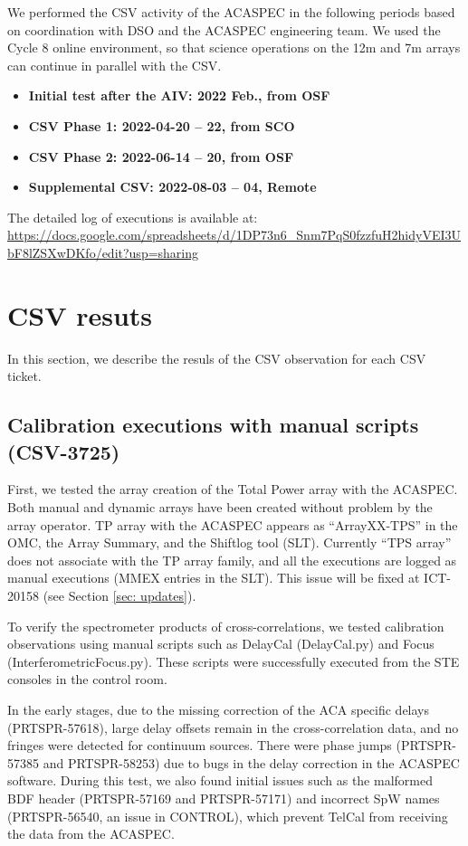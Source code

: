 We performed the CSV activity of the ACASPEC in the following periods based on coordination with DSO and the ACASPEC engineering team. We used the Cycle 8 online environment, so that science operations on the 12m and 7m arrays can continue in parallel with the CSV. 
\begin{itemize}
\item \textbf{Initial test after the AIV: 2022 Feb., from OSF}
\item \textbf{CSV Phase 1: 2022-04-20 -- 22, from SCO}
\item \textbf{CSV Phase 2: 2022-06-14 -- 20, from OSF}
\item \textbf{Supplemental CSV: 2022-08-03 -- 04, Remote}
\end{itemize}
The detailed log of executions is available at:\\
\url{https://docs.google.com/spreadsheets/d/1DP73n6_Snm7PqS0fzzfuH2hidyVEI3UbF8lZSXwDKfo/edit?usp=sharing}  

\newpage
\section{CSV resuts}\label{sec:result}
In this section, we describe the resuls of the CSV observation for each CSV ticket. 

\subsection{Calibration executions with manual scripts (CSV-3725)}
First, we tested the array creation of the Total Power array with the ACASPEC. Both manual and dynamic arrays have been created without problem by the array operator. TP array with the ACASPEC appears as ``ArrayXX-TPS'' in the OMC, the Array Summary, and the Shiftlog tool (SLT). Currently ``TPS array'' does not associate with the TP array family, and all the executions are logged as manual executions (MMEX entries in the SLT). This issue will be fixed at ICT-20158 (see Section \ref{sec: updates}).   

To verify the spectrometer products of cross-correlations, we tested calibration observations using manual scripts such as DelayCal (DelayCal.py) and Focus (InterferometricFocus.py). These scripts were successfully executed from the STE consoles in the control room. 

In the early stages, due to the missing correction of the ACA specific delays (PRTSPR-57618), large delay offsets remain in the cross-correlation data, and no fringes were detected for continuum sources. There were phase jumps (PRTSPR-57385 and PRTSPR-58253) due to bugs in the delay correction in the ACASPEC software. During this test, we also found initial issues such as the malformed BDF header (PRTSPR-57169 and PRTSPR-57171) and incorrect SpW names (PRTSPR-56540, an issue in CONTROL), which prevent TelCal from receiving the data from the ACASPEC. 

